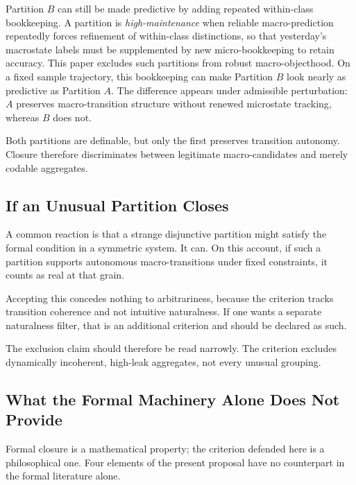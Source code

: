 Partition \(B\) can still be made predictive by adding repeated
within-class bookkeeping. A partition is \emph{high-maintenance} when
reliable macro-prediction repeatedly forces refinement of within-class
distinctions, so that yesterday's macrostate labels must be supplemented
by new micro-bookkeeping to retain accuracy. This paper excludes such
partitions from robust macro-objecthood.
On a fixed sample trajectory, this bookkeeping can make Partition \(B\)
look nearly as predictive as Partition \(A\). The difference appears
under admissible perturbation: \(A\) preserves macro-transition structure
without renewed microstate tracking, whereas \(B\) does not.

Both partitions are definable, but only the first preserves transition
autonomy. Closure therefore discriminates between legitimate
macro-candidates and merely codable aggregates.

\subsection{If an Unusual Partition
	Closes}\label{if-an-unusual-partition-closes}

A common reaction is that a strange disjunctive partition might satisfy
the formal condition in a symmetric system. It can. On this account, if
such a partition supports autonomous macro-transitions under fixed
constraints, it counts as real at that grain.

Accepting this concedes nothing to arbitrariness, because the criterion
tracks transition coherence and not intuitive naturalness. If one wants
a separate naturalness filter, that is an additional criterion and
should be declared as such.

The exclusion claim should therefore be read narrowly. The criterion
excludes dynamically incoherent, high-leak aggregates, not every unusual
grouping.

\subsection{What the Formal Machinery Alone Does Not
	Provide}\label{what-the-formal-machinery-alone-does-not-provide}

Formal closure is a mathematical property; the criterion defended here is a philosophical one. Four elements of the present proposal have
no counterpart in the formal literature alone.

